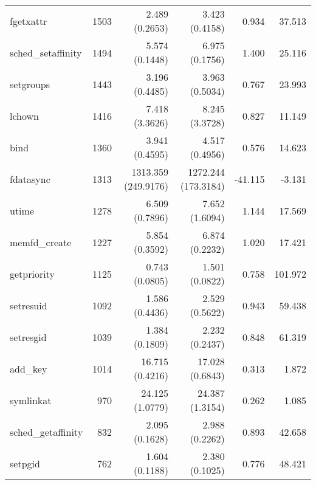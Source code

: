 \begin{longtable}{>{\ttfamily}lrrrrr}
                      fgetxattr &       1503 &              2.489 (0.2653) &            3.423 (0.4158) &           0.934 &       37.513 \\
             sched\_setaffinity &       1494 &              5.574 (0.1448) &            6.975 (0.1756) &           1.400 &       25.116 \\
                      setgroups &       1443 &              3.196 (0.4485) &            3.963 (0.5034) &           0.767 &       23.993 \\
                         lchown &       1416 &              7.418 (3.3626) &            8.245 (3.3728) &           0.827 &       11.149 \\
                           bind &       1360 &              3.941 (0.4595) &            4.517 (0.4956) &           0.576 &       14.623 \\
                      fdatasync &       1313 &         1313.359 (249.9176) &       1272.244 (173.3184) &         -41.115 &       -3.131 \\
                          utime &       1278 &              6.509 (0.7896) &            7.652 (1.6094) &           1.144 &       17.569 \\
                  memfd\_create &       1227 &              5.854 (0.3592) &            6.874 (0.2232) &           1.020 &       17.421 \\
                    getpriority &       1125 &              0.743 (0.0805) &            1.501 (0.0822) &           0.758 &      101.972 \\
                      setresuid &       1092 &              1.586 (0.4436) &            2.529 (0.5622) &           0.943 &       59.438 \\
                      setresgid &       1039 &              1.384 (0.1809) &            2.232 (0.2437) &           0.848 &       61.319 \\
                       add\_key &       1014 &             16.715 (0.4216) &           17.028 (0.6843) &           0.313 &        1.872 \\
                      symlinkat &        970 &             24.125 (1.0779) &           24.387 (1.3154) &           0.262 &        1.085 \\
             sched\_getaffinity &        832 &              2.095 (0.1628) &            2.988 (0.2262) &           0.893 &       42.658 \\
                        setpgid &        762 &              1.604 (0.1188) &            2.380 (0.1025) &           0.776 &       48.421 \\

\end{longtable}
